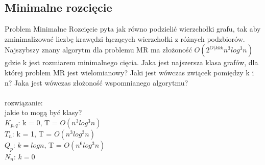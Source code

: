 \documentclass{article}
\begin{document}
\subsection*{Minimalne rozcięcie}
Problem Minimalne Rozcięcie pyta jak równo podzielić wierzchołki grafu, tak aby zminimalizować liczbę krawędzi łączących wierzchołki z różnych podzbiorów.
Najszybszy znany algorytm dla problemu MR ma złożoność $O(2^{O(kkk}n^3log^3n)$ gdzie k jest rozmiarem minimalnego cięcia. Jaka jest najszersza klasa grafów, 
dla której problem MR jest wielomianowy? Jaki jest wówczas zwiącek pomiędzy k i n? Jaka jest wówczas złożoność wspomnianego algorytmu? \\\\rozwiązanie:\\
jakie to mogą być klasy? \\
$K_{p,q}$: k = 0, T = $O(n^3log^3n)$ \\
$T_n$: k = 1,  T = $O(n^3log^3n)$ \\
$Q_p$: $k = logn$, T = $O(n^6log^3n)$ \\
$N_n$: $k = 0$
\end{document}
